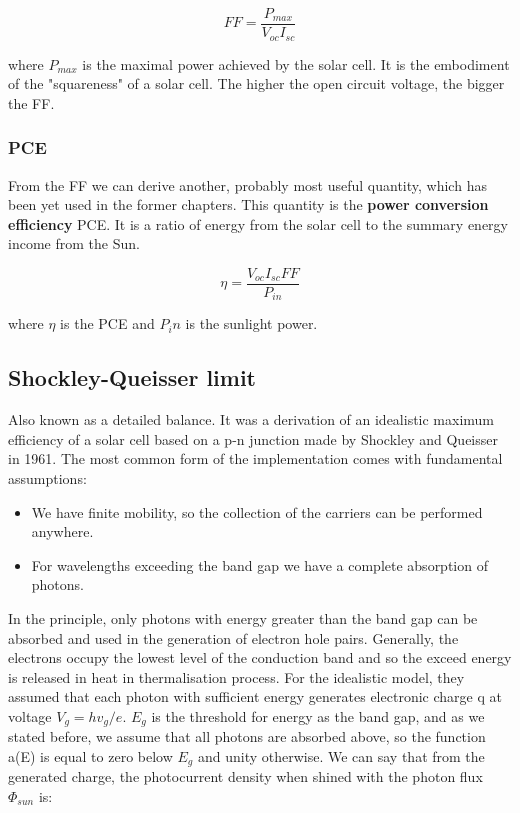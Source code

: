 \begin{equation}
FF = \frac{P_{max}}{V_{oc}I_{sc}}
\end{equation}

where $P_{max}$ is the maximal power achieved by the solar cell. It is the   embodiment of the "squareness" of a solar cell. The higher the open circuit voltage, the bigger the FF. 

\subsubsection{PCE}

From the FF we can derive another, probably most useful quantity, which has been yet used in the former chapters. This quantity is the \textbf{power conversion efficiency} PCE. It is a ratio of energy from the solar cell to the summary energy income from the Sun. 

\begin{equation}
\eta = \frac{V_{oc}I_{sc}FF}{P_{in}}
\end{equation}

where $\eta$ is the PCE and $P_in$ is the sunlight power. 

\subsection{Shockley-Queisser limit}

Also known as a detailed balance. It was a derivation of an idealistic maximum efficiency of a solar cell based on a p-n junction made by Shockley and Queisser in 1961\cite{limit}. The most common form of the implementation comes with fundamental assumptions:

\begin{itemize}
\item We have finite mobility, so the collection of the carriers can be performed anywhere.
\item For wavelengths exceeding the band gap we have a complete absorption of photons.
\end{itemize}


In the principle, only photons with energy greater than the band gap can be absorbed and used in the generation of electron hole pairs. Generally, the electrons occupy the lowest level of the conduction band and so the exceed energy is released in heat in thermalisation process. For the idealistic model, they assumed that each photon with sufficient energy generates electronic charge q at voltage $V_g=hv_g/e$. $E_g$ is the threshold for energy as the band gap, and as we stated before, we assume that all photons are absorbed above, so the function a(E) is equal to zero below $E_g$ and unity otherwise. We can say that from the generated charge, the photocurrent density when shined with the photon flux $\Phi _{sun}$ is:

